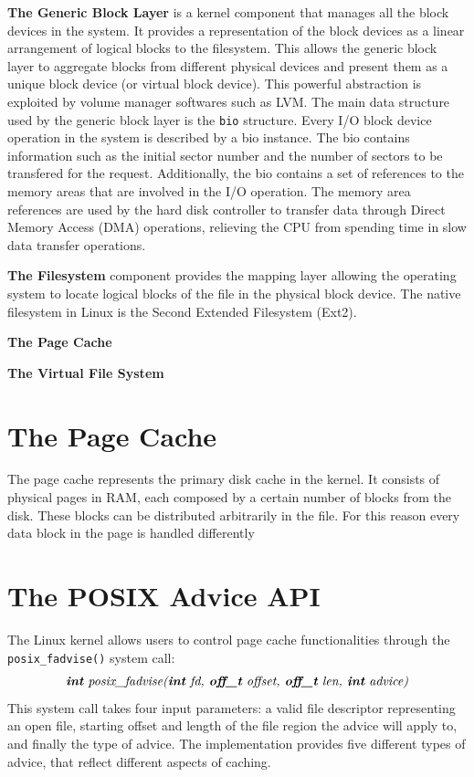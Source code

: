 \vspace{5mm}
\textbf{The Generic Block Layer} is a kernel component that manages all the block devices in the system. It provides a representation of the block devices as a linear arrangement of logical blocks
to the filesystem. This allows the generic block layer to aggregate blocks from different physical devices and present them as a unique block device (or virtual block device). This powerful abstraction
is exploited by volume manager softwares such as LVM. The main data structure used by the generic block layer is the \texttt{bio} structure. Every I/O block device operation in the system is described 
by a bio instance. The bio contains information such as the initial sector number and the number of sectors to be transfered for the request. Additionally, the bio contains a set of references to the 
memory areas that are involved in the I/O operation. The memory area references are used by the hard disk controller to transfer data through Direct Memory Access (DMA) operations, relieving the CPU 
from spending time in slow data transfer operations.

\vspace{5mm}
\textbf{The Filesystem} component provides the mapping layer allowing the operating system to locate logical blocks of the file in the physical block device. The native filesystem in Linux is the Second 
Extended Filesystem (Ext2).

\vspace{5mm}
\textbf{The Page Cache}

\vspace{5mm}
\textbf{The Virtual File System}

\section{The Page Cache}
The page cache represents the primary disk cache in the kernel. It consists of physical pages in RAM, each composed by a certain number of blocks from the disk. These blocks can be distributed arbitrarily
in the file. For this reason every data block in the page is handled differently 

\section{The POSIX Advice API}
\label{sec: posix_advice_api}
The Linux kernel allows users to control page cache functionalities through the \texttt{posix\_fadvise()} system call: 
$$\textit{\textbf{int} posix\_fadvise(\textbf{int} fd, \textbf{off\_t} offset, \textbf{off\_t} len, \textbf{int} advice)}$$ 
This system call takes four input parameters: a valid file descriptor representing an open file, starting offset and length of the file region the advice will apply to, and finally the type 
of advice. The implementation provides five different types of advice, that reflect different aspects of caching.

